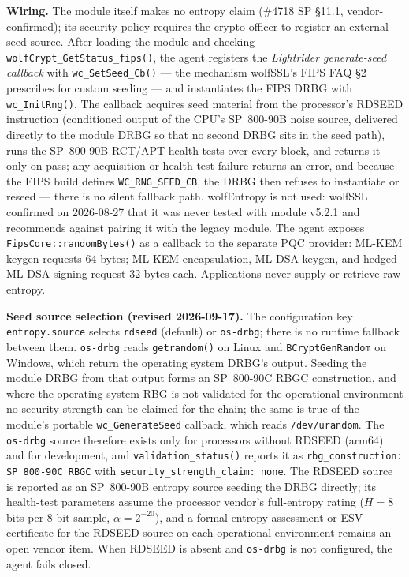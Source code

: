 \documentclass[10pt]{article}
\newcommand{\code}[1]{\texttt{\small #1}}
\begin{document}
\textbf{Wiring.} The module itself makes no entropy claim (\#4718 SP \S11.1,
vendor-confirmed); its security policy requires the crypto officer to register an
external seed source. After loading the module and checking
\code{wolfCrypt\_GetStatus\_fips()}, the agent registers the \emph{Lightrider
generate-seed callback} with \code{wc\_SetSeed\_Cb()} --- the mechanism wolfSSL's FIPS
FAQ \S2 prescribes for custom seeding --- and instantiates the FIPS DRBG with
\code{wc\_InitRng()}. The callback acquires seed material from the processor's RDSEED
instruction (conditioned output of the CPU's SP~800-90B noise source, delivered directly
to the module DRBG so that no second DRBG sits in the seed path), runs the SP~800-90B
RCT/APT health tests over every block, and returns it only on pass; any acquisition or health-test failure returns an error, and because the
FIPS build defines \code{WC\_RNG\_SEED\_CB}, the DRBG then refuses to instantiate or
reseed --- there is no silent fallback path. wolfEntropy is not used: wolfSSL confirmed
on 2026-08-27 that it was never tested with module v5.2.1 and recommends against pairing
it with the legacy module. The agent exposes
\code{FipsCore::randomBytes()} as a callback to the separate PQC provider: ML-KEM keygen
requests 64 bytes; ML-KEM encapsulation, ML-DSA keygen, and hedged ML-DSA signing request
32 bytes each. Applications never supply or retrieve raw entropy.

\textbf{Seed source selection (revised 2026-09-17).} The configuration key
\code{entropy.source} selects \code{rdseed} (default) or \code{os-drbg}; there is no
runtime fallback between them. \code{os-drbg} reads \code{getrandom()} on Linux and
\code{BCryptGenRandom} on Windows, which return the operating system DRBG's output.
Seeding the module DRBG from that output forms an SP~800-90C RBGC construction, and
where the operating system RBG is not validated for the operational environment no
security strength can be claimed for the chain; the same is true of the module's
portable \code{wc\_GenerateSeed} callback, which reads \code{/dev/urandom}. The
\code{os-drbg} source therefore exists only for processors without RDSEED (arm64) and
for development, and \code{validation\_status()} reports it as
\code{rbg\_construction: SP 800-90C RBGC} with \code{security\_strength\_claim: none}.
The RDSEED source is reported as an SP~800-90B entropy source seeding the DRBG directly;
its health-test parameters assume the processor vendor's full-entropy rating
($H = 8$ bits per 8-bit sample, $\alpha = 2^{-20}$), and a formal entropy assessment or
ESV certificate for the RDSEED source on each operational environment remains an open
vendor item. When RDSEED is absent and \code{os-drbg} is not configured, the agent fails
closed.
\end{document}
